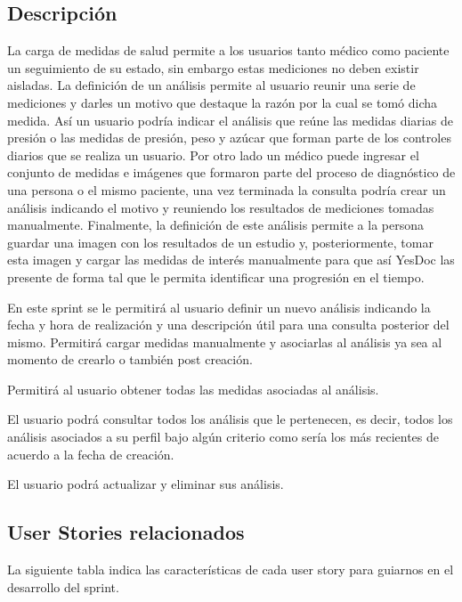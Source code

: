 \documentclass[a4paper,12pt]{article}
\begin{document}
\subsection{Descripción}

	La carga de medidas de salud permite a los usuarios tanto médico como paciente un seguimiento de su estado, sin embargo estas mediciones no deben existir aisladas. La definición de un análisis permite al usuario reunir una serie de mediciones y darles un motivo que destaque la razón por la cual se tomó dicha medida. Así un usuario podría indicar el análisis que reúne las medidas diarias de presión o las medidas de presión, peso y azúcar que forman parte de los controles diarios que se realiza un usuario. Por otro lado un médico puede ingresar el conjunto de medidas e imágenes que formaron parte del proceso de diagnóstico de una persona o el mismo paciente, una vez terminada la consulta podría crear un análisis indicando el motivo y reuniendo los resultados de mediciones tomadas manualmente. Finalmente, la definición de este análisis permite a la persona guardar una imagen con los resultados de un estudio y, posteriormente, tomar esta imagen y cargar las medidas de interés manualmente para que así YesDoc las presente de forma tal que le permita identificar una progresión en el tiempo.
	
	En este sprint se le permitirá al usuario definir un nuevo análisis indicando la fecha y hora de realización y una descripción útil para una consulta posterior del mismo. Permitirá cargar medidas manualmente y asociarlas al análisis ya sea al momento de crearlo o también post creación.
	
	Permitirá al usuario obtener todas las medidas asociadas al análisis.
	
	El usuario podrá consultar todos los análisis que le pertenecen, es decir, todos los análisis asociados a su perfil bajo algún criterio como sería los más recientes de acuerdo a la fecha de creación. 
	
	El usuario podrá actualizar y eliminar sus análisis.
	
	 

\subsection{User Stories relacionados}
La siguiente tabla indica las características de cada user story para guiarnos en el desarrollo del sprint.
\end{document}
